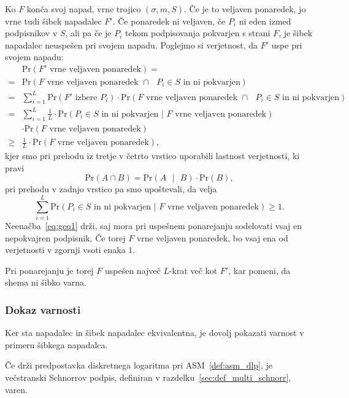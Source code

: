 \documentclass[isrm2, tisk]{fmfdelo}
\begin{document}
\begin{dokaz}
    Ko $F$ konča svoj napad, vrne trojico $(\sigma, m, S)$. Če je to veljaven ponaredek, jo vrne tudi
    šibek napadalec $F'$. Če ponaredek ni veljaven, če $P_i$ ni eden izmed podpisnikov v $S$, ali pa
    če je $P_i$ tekom podpisovanja pokvarjen s strani $F$, je šibek napadalec neuspešen pri svojem napadu.
    Poglejmo si verjetnost, da $F'$ uspe pri svojem napadu:
    \begin{align*}
          &\text{Pr}(\text{$F'$ vrne veljaven ponaredek}) = \\
        = &\text{Pr}(\text{$F$ vrne veljaven ponaredek } \cap \text{ $P_i \in S$ in ni pokvarjen}) \\
        = &\sum_{i=1}^L \text{Pr}(\text{$F'$ izbere $P_i$}) \cdot 
            \text{Pr}(\text{$F$ vrne veljaven ponaredek } \cap \text{ $P_i \in S$ in ni pokvarjen}) \\
        = &\sum_{i=1}^L \frac{1}{L} \cdot 
            \text{Pr}(\text{$P_i \in S$ in ni pokvarjen | $F$ vrne veljaven ponaredek}) \\
          &\cdot \text{Pr}(\text{$F$ vrne veljaven ponaredek}) \\
        \geq &\frac{1}{L} \cdot \text{Pr}(\text{$F$ vrne veljaven ponaredek}),
    \end{align*}
kjer smo pri prehodu iz tretje v četrto vrstico uporabili lastnost verjetnosti, ki pravi
$$
\text{Pr}(A \cap B) = \text{Pr}(A \text{ }|\text{ } B) \cdot \text{Pr}(B),
$$
pri prehodu v zadnjo vrstico pa smo upoštevali, da velja
\begin{equation}
\label{eq:geq1}
\sum_{i=1}^L \text{Pr}(\text{$P_i \in S$ in ni pokvarjen | $F$ vrne veljaven ponaredek}) \geq 1.
\end{equation}
Neenačba~\eqref{eq:geq1} drži, saj mora pri uspešnem ponarejanju sodelovati vsaj en nepokvajren
podpisnik. Če torej $F$ vrne veljaven ponaredek, bo vsaj ena od verjetnosti v zgornji vsoti enaka $1$.

Pri ponarejanju je torej $F$ uspešen največ $L$-krat več kot $F'$, kar pomeni, da shema ni šibko
varna.
\end{dokaz}

\subsubsection{Dokaz varnosti}
Ker sta napadalec in šibek napadalec ekvivalentna, je dovolj pokazati varnost v primeru šibkega
napadalca.

\begin{izrek}
    Če drži predpostavka diskretnega logaritma pri ASM~\ref{def:asm_dlp}, je večstranski Schnorrov
    podpis, definiran v razdelku~\ref{sec:def_multi_schnorr}, varen.
\end{izrek}
\end{document}
